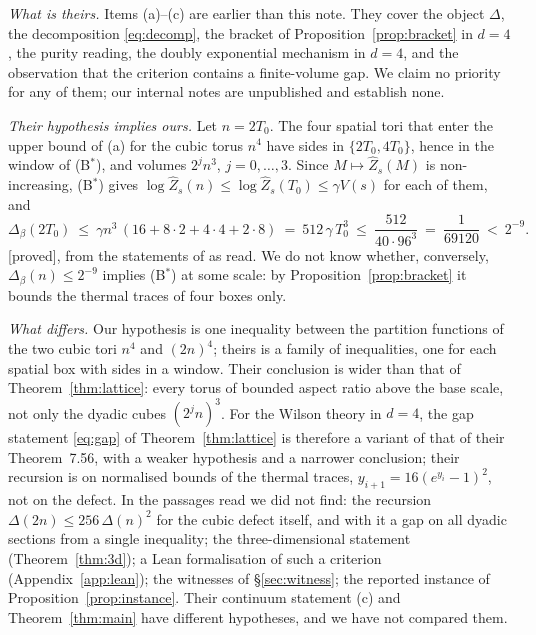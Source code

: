 \documentclass[11pt,a4paper]{article}
\theoremstyle{plain}
\theoremstyle{definition}
\theoremstyle{remark}
\numberwithin{equation}{section}
\newcommand{\st}[1]{\textsf{[#1]}}
\begin{document}
\emph{What is theirs.} Items (a)--(c) are earlier than this note. They cover the object $\Delta$, the decomposition \eqref{eq:decomp}, the
bracket of Proposition~\ref{prop:bracket} in $d=4$, the purity reading, the doubly exponential mechanism in $d=4$, and the observation that
the criterion contains a finite-volume gap. We claim no priority for any of them; our internal notes \cite{internal} are unpublished and
establish none.

\emph{Their hypothesis implies ours.} Let $n=2T_0$. The four spatial tori that enter the upper bound of (a) for the cubic torus $n^4$ have
sides in $\{2T_0,4T_0\}$, hence in the window of (B$^*$), and volumes $2^jn^3$, $j=0,\dots,3$. Since $M\mapsto\widehat Z_s(M)$ is
non-increasing, (B$^*$) gives $\log\widehat Z_s(n)\le\log\widehat Z_s(T_0)\le\gamma V(s)$ for each of them, and
\begin{equation}\label{eq:bb26implies}
\Delta_\beta(2T_0)\ \le\ \gamma n^3\,(16+8\cdot2+4\cdot4+2\cdot8)\ =\ 512\,\gamma\,T_0^3\ \le\ \frac{512}{40\cdot96^3}\ =\ \frac1{69120}\ <\ 2^{-9}.
\end{equation}
\st{proved}, from the statements of \cite{BB26v5} as read. We do not know whether, conversely, $\Delta_\beta(n)\le2^{-9}$ implies (B$^*$) at
some scale: by Proposition~\ref{prop:bracket} it bounds the thermal traces of four boxes only.

\emph{What differs.} Our hypothesis is one inequality between the partition functions of the two cubic tori $n^4$ and $(2n)^4$; theirs is a
family of inequalities, one for each spatial box with sides in a window. Their conclusion is wider than that of Theorem~\ref{thm:lattice}:
every torus of bounded aspect ratio above the base scale, not only the dyadic cubes $(2^jn)^3$. For the Wilson theory in $d=4$, the gap
statement \eqref{eq:gap} of Theorem~\ref{thm:lattice} is therefore a variant of that of their Theorem~7.56, with a weaker hypothesis and a
narrower conclusion; their recursion is on normalised bounds of the thermal traces, $y_{i+1}=16(e^{y_i}-1)^2$, not on the defect. In the passages read
we did not find: the recursion $\Delta(2n)\le256\,\Delta(n)^2$ for the cubic defect itself, and with it a gap on all dyadic sections from a
single inequality; the three-dimensional statement (Theorem~\ref{thm:3d}); a Lean formalisation of such a criterion
(Appendix~\ref{app:lean}); the witnesses of \S\ref{sec:witness}; the reported instance of Proposition~\ref{prop:instance}. Their continuum
statement (c) and Theorem~\ref{thm:main} have different hypotheses, and we have not compared them.
\end{document}
